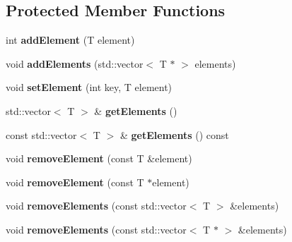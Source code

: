 \subsection*{Protected Member Functions}
\begin{DoxyCompactItemize}
\item 
\hypertarget{classtg_taggables_a1ec887791db68183f81e07b173191885}{int {\bfseries add\-Element} (T element)}\label{classtg_taggables_a1ec887791db68183f81e07b173191885}

\item 
\hypertarget{classtg_taggables_a74a6535cefcc552eb7edf330908526b1}{void {\bfseries add\-Elements} (std\-::vector$<$ T $\ast$ $>$ elements)}\label{classtg_taggables_a74a6535cefcc552eb7edf330908526b1}

\item 
\hypertarget{classtg_taggables_a67f59350e693840f529b1296d6dce24e}{void {\bfseries set\-Element} (int key, T element)}\label{classtg_taggables_a67f59350e693840f529b1296d6dce24e}

\item 
\hypertarget{classtg_taggables_a84d597b78dd84f0b283fcc29a7d6870e}{std\-::vector$<$ T $>$ \& {\bfseries get\-Elements} ()}\label{classtg_taggables_a84d597b78dd84f0b283fcc29a7d6870e}

\item 
\hypertarget{classtg_taggables_aa02f05de49b941454ced7b9acc9be80e}{const std\-::vector$<$ T $>$ \& {\bfseries get\-Elements} () const }\label{classtg_taggables_aa02f05de49b941454ced7b9acc9be80e}

\item 
\hypertarget{classtg_taggables_a15e9f671d96021a4f6a05d1c19eed441}{void {\bfseries remove\-Element} (const T \&element)}\label{classtg_taggables_a15e9f671d96021a4f6a05d1c19eed441}

\item 
\hypertarget{classtg_taggables_a6b5950b18acd5905dfbed9d97ac7dc82}{void {\bfseries remove\-Element} (const T $\ast$element)}\label{classtg_taggables_a6b5950b18acd5905dfbed9d97ac7dc82}

\item 
\hypertarget{classtg_taggables_a5539a39d29b42ce2770b106cd7ddd38e}{void {\bfseries remove\-Elements} (const std\-::vector$<$ T $>$ \&elements)}\label{classtg_taggables_a5539a39d29b42ce2770b106cd7ddd38e}

\item 
\hypertarget{classtg_taggables_a83f364ebce003fbaad9672c7f5a50847}{void {\bfseries remove\-Elements} (const std\-::vector$<$ T $\ast$ $>$ \&elements)}\label{classtg_taggables_a83f364ebce003fbaad9672c7f5a50847}


\end{DoxyCompactItemize}
